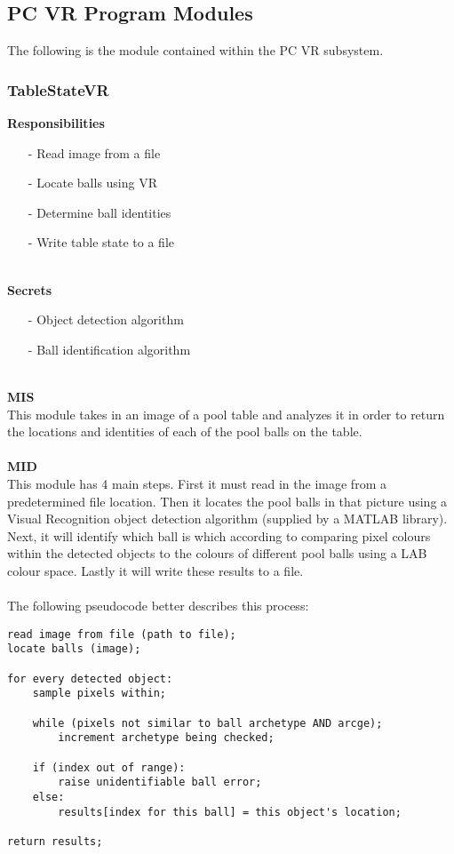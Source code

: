 \documentclass[titlepage]{article}
\begin{document}
\subsection{PC VR Program Modules}
The following is the module contained within the PC VR subsystem.
\subsubsection{TableStateVR}
\textbf{Responsibilities}
\begin{itemize}
	\item[-] Read image from a file
	\item[-] Locate balls using VR
	\item[-] Determine ball identities
	\item[-] Write table state to a file
\end{itemize}~\\
\textbf{Secrets}
\begin{itemize}
	\item[-] Object detection algorithm
	\item[-] Ball identification algorithm
\end{itemize}~\\
\textbf{MIS}\\[2mm]
This module takes in an image of a pool table and analyzes it in order to return the locations and identities of each of the pool balls on the table.
\\\\
\textbf{MID}\\[2mm]
This module has 4 main steps. First it must read in the image from a predetermined file location. Then it locates the pool balls in that picture using a Visual Recognition object detection algorithm (supplied by a MATLAB library). Next, it will identify which ball is which according to comparing pixel colours within the detected objects to the colours of different pool balls using a LAB colour space. Lastly it will write these results to a file.\\~\\
The following pseudocode better describes this process:
\begin{lstlisting}
read image from file (path to file);
locate balls (image);

for every detected object:
	sample pixels within;
	
	while (pixels not similar to ball archetype AND arcge);
		increment archetype being checked;
		
	if (index out of range):
		raise unidentifiable ball error;
	else:
		results[index for this ball] = this object's location;

return results;
\end{lstlisting}~\\
\end{document}
